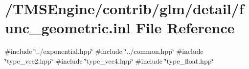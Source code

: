 \hypertarget{func__geometric_8inl}{}\section{/\+T\+M\+S\+Engine/contrib/glm/detail/func\+\_\+geometric.inl File Reference}
\label{func__geometric_8inl}
{\ttfamily \#include \char`\"{}../exponential.\+hpp\char`\"{}}\newline
{\ttfamily \#include \char`\"{}../common.\+hpp\char`\"{}}\newline
{\ttfamily \#include \char`\"{}type\+\_\+vec2.\+hpp\char`\"{}}\newline
{\ttfamily \#include \char`\"{}type\+\_\+vec4.\+hpp\char`\"{}}\newline
{\ttfamily \#include \char`\"{}type\+\_\+float.\+hpp\char`\"{}}\newline
